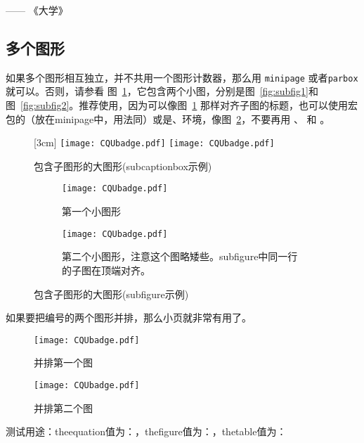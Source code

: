 \hfill —— 《大学》


\subsection{多个图形}
\label{sec:multifig}

如果多个图形相互独立，并不共用一个图形计数器，那么用 \texttt{minipage} 或者\texttt{parbox} 就可以。否则，请参看
图~\ref{fig:big1-subcaptionbox}，它包含两个小图，分别是图~\ref{fig:subfig1}和图~\ref{fig:subfig2}。推荐使用，因为可以像图~\ref{fig:big1-subcaptionbox} 那样对齐子图的标题，也可以使用宏包的（放在minipage中，用法同）或是、环境，像图~\ref{fig:big1-subfigure}，不要再用 、 和 。

\begin{figure}[h]
	\centering%
	[3cm] %
	{\texttt{[image: CQUbadge.pdf]}}%
	\hspace{4em}%
	{\texttt{[image: CQUbadge.pdf]}}
	\caption{包含子图形的大图形(subcaptionbox示例)}
	\label{fig:big1-subcaptionbox}
\end{figure}
\begin{figure}[ht]
	\centering%
	\begin{subfigure}{3cm}
		\texttt{[image: CQUbadge.pdf]}
		\caption{第一个小图形}
	\end{subfigure}%
	\hspace{4em}%
	\begin{subfigure}{0.5\textwidth}
		\texttt{[image: CQUbadge.pdf]}
		\caption{第二个小图形，注意这个图略矮些。subfigure中同一行的子图在顶端对齐。}
	\end{subfigure}
	\caption{包含子图形的大图形(subfigure示例)}
	\label{fig:big1-subfigure}
\end{figure}

如果要把编号的两个图形并排，那么小页就非常有用了。
\begin{figure}
	\begin{minipage}{0.48\textwidth}
		\centering
		\texttt{[image: CQUbadge.pdf]}
		\caption{并排第一个图}
		\label{fig:parallel1}
	\end{minipage}\hfill
	\begin{minipage}{0.48\textwidth}
		\centering
		\texttt{[image: CQUbadge.pdf]}
		\caption{并排第二个图}
		\label{fig:parallel2}
	\end{minipage}
\end{figure}

测试用途：theequation值为：\theequation ，thefigure值为：\thefigure ，thetable值为：\thetable
